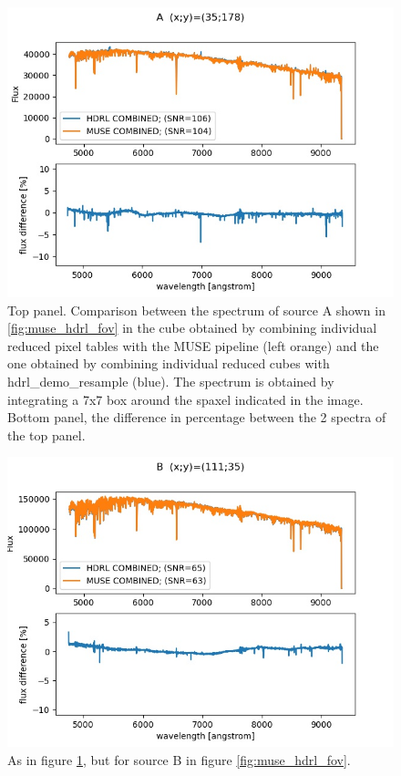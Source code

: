 \begin{figure}[H]
\centering
\includegraphics[width=12cm]{figures/spc_A.jpg}
\caption[] {\footnotesize Top panel. Comparison between the spectrum
  of source A shown in \ref{fig:muse_hdrl_fov} in the cube obtained by
  combining individual reduced pixel tables with the MUSE pipeline
  (left orange) and the one obtained by combining individual reduced
  cubes with hdrl\_demo\_resample (blue). The spectrum is obtained by
  integrating a 7x7 box around the spaxel indicated in the
  image. Bottom panel, the difference in percentage between the 2
  spectra of the top panel.}
	\label{fig:muse_hdrl_spcA}
\end{figure}


\begin{figure}[H]
\centering
\includegraphics[width=12cm]{figures/spc_B.jpg}
\caption[] {\footnotesize As in figure \ref{fig:muse_hdrl_spcA}, but for source B in figure \ref{fig:muse_hdrl_fov}.}
	\label{fig:muse_hdrl_spcB}
\end{figure}

